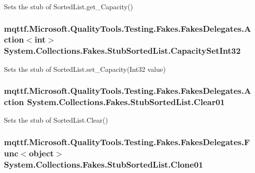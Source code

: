 Sets the stub of Sorted\-List.\-get\-\_\-\-Capacity()

\hypertarget{class_system_1_1_collections_1_1_fakes_1_1_stub_sorted_list_ab3e3be9d5e68515038767798cf45662a}{
\subsubsection[{Capacity\-Set\-Int32}]{\setlength{\rightskip}{0pt plus 5cm}mqttf.\-Microsoft.\-Quality\-Tools.\-Testing.\-Fakes.\-Fakes\-Delegates.\-Action$<$int$>$ System.\-Collections.\-Fakes.\-Stub\-Sorted\-List.\-Capacity\-Set\-Int32}}\label{class_system_1_1_collections_1_1_fakes_1_1_stub_sorted_list_ab3e3be9d5e68515038767798cf45662a}


Sets the stub of Sorted\-List.\-set\-\_\-\-Capacity(\-Int32 value)

\hypertarget{class_system_1_1_collections_1_1_fakes_1_1_stub_sorted_list_aba2812ce55be7ee875e0b47f829215df}{
\subsubsection[{Clear01}]{\setlength{\rightskip}{0pt plus 5cm}mqttf.\-Microsoft.\-Quality\-Tools.\-Testing.\-Fakes.\-Fakes\-Delegates.\-Action System.\-Collections.\-Fakes.\-Stub\-Sorted\-List.\-Clear01}}\label{class_system_1_1_collections_1_1_fakes_1_1_stub_sorted_list_aba2812ce55be7ee875e0b47f829215df}


Sets the stub of Sorted\-List.\-Clear()

\hypertarget{class_system_1_1_collections_1_1_fakes_1_1_stub_sorted_list_a860f9f8b3a9cf7df55dda030420feb08}{
\subsubsection[{Clone01}]{\setlength{\rightskip}{0pt plus 5cm}mqttf.\-Microsoft.\-Quality\-Tools.\-Testing.\-Fakes.\-Fakes\-Delegates.\-Func$<$object$>$ System.\-Collections.\-Fakes.\-Stub\-Sorted\-List.\-Clone01}}\label{class_system_1_1_collections_1_1_fakes_1_1_stub_sorted_list_a860f9f8b3a9cf7df55dda030420feb08}


